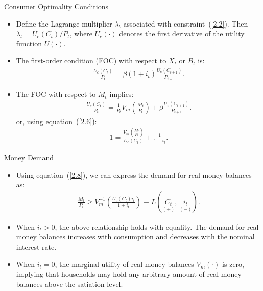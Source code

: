 \documentclass[11pt,aspectratio=169]{beamer}
\begin{document}
\begin{frame}{Consumer Optimality Conditions}
\small
\begin{itemize}
 \item Define the Lagrange multiplier $\lambda_t$ associated with constraint~(\ref{2.2}). Then $\lambda_t = U_c(C_t)/P_t$, where $U_c(\cdot)$ denotes the first derivative of the utility function $U(\cdot)$. 
 \vspace{0.35em}

 \item The first-order condition (FOC) with respect to $X_t$ or $B_t$ is:
 \begin{align}
 \frac{U_c(C_t)}{P_t}=\beta (1+i_t)\frac{U_c(C_{t+1})}{P_{t+1}}. \label{2.6}
 \end{align}

 \vspace{0.35em}
 \item The FOC with respect to $M_t$ implies:
 \begin{align}
 \frac{U_c(C_t)}{P_t}=\frac{1}{P_t}V_m(\frac{M_t}{P_t})+\beta \frac{U_c(C_{t+1})}{P_{t+1}}. \label{2.7}
 \end{align}
 or, using equation~(\ref{2.6}):
 \begin{align}
 1=\frac{V_m(\frac{M_t}{P_t})}{U_c(C_t)}+\frac{1}{1+i_t}. \label{2.8}
 \end{align}
\end{itemize}

\end{frame}
\begin{frame}{Money Demand}

\begin{itemize}

    \item Using equation~(\ref{2.8}), we can express the demand for real money balances as:
    \begin{align*}
        \frac{M_t}{P_t} \ge 
        V_m^{-1}\!\left( 
            \frac{U_c(C_t)i_t}{1+i_t}
        \right)
        \equiv 
        L\!\left(
            \underset{(+)}{C_t},\,
            \underset{(-)}{i_t}
        \right).
    \end{align*}

    \item When $i_t > 0$, the above relationship holds with equality.  
    The demand for real money balances increases with consumption and decreases with the nominal interest rate.

    \item When $i_t = 0$, the marginal utility of real money balances $V_m(\cdot)$ is zero, implying that households may hold any arbitrary amount of real money balances above the satiation level.
    
\end{itemize}

\end{frame}
\end{document}
